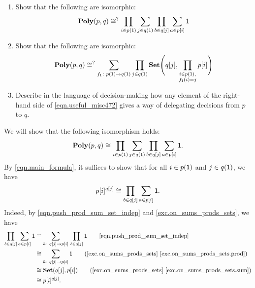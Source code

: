 \documentclass[Book-Poly]{subfiles}
\begin{document}
\begin{exercise}\label{exc.practice_sum_prod}
\begin{enumerate}
\item Show that the following are isomorphic:
\begin{equation}\label{eqn.poly_p_q}
  \mathbf{Poly}(p,q)
  \cong^?
  \prod_{i\in p(\textsf{1})}\sum_{j\in q(\textsf{1})}\prod_{b\in q[j]}\sum_{a\in p[i]}\textsf{1}
\end{equation}
\item \label{exc.practice_sum_prod.useful} Show that the following are isomorphic:
	\begin{equation}\label{eqn.useful_misc472}
	\mathbf{Poly}(p,q)\cong^?\sum_{f_{\textsf{1}}\colon p(\textsf{1})\to q(\textsf{1})}\prod_{j\in q(\textsf{1})}\mathbf{Set}\Bigg(q[j],\prod_{\substack{i \in p(\textsf{1}), \\ f_{\textsf{1}}(i) = j}}p[i]\Bigg)
	\end{equation}
\item Describe in the language of decision-making how any element of the right-hand side of \eqref{eqn.useful_misc472} gives a way of delegating decisions from $p$ to $q$.
\qedhere
\end{enumerate}
\begin{solution}
\begin{longenum}
\item We will show that the following isomorphism holds:
\[
  \mathbf{Poly}(p,q)
  \cong
  \prod_{i\in p(\textsf{1})}\sum_{j\in q(\textsf{1})}\prod_{b\in q[j]}\sum_{a\in p[i]}\textsf{1}.
\]
By \eqref{eqn.main_formula}, it suffices to show that for all $i \in p(\textsf{1})$ and $j \in q(\textsf{1})$, we have
\[
    p[i]^{q[j]} \cong \prod_{b \in q[j]} \sum_{a \in p[i]} \textsf{1}.
\]
Indeed, by \eqref{eqn.push_prod_sum_set_indep} and \cref{exc.on_sums_prods_sets}, we have
\begin{align*}
    \prod_{b \in q[j]} \sum_{a \in p[i]} \1 &\iso \sum_{\bar{a} \colon q[j] \to p[i]} \, \prod_{b \in q[j]} \1 \tag*{\eqref{eqn.push_prod_sum_set_indep}} \\
    &\iso \sum_{\bar{a} \colon q[j] \to p[i]} \1 \tag{\cref{exc.on_sums_prods_sets} \cref{exc.on_sums_prods_sets.prod}} \\
    &\iso \smset(q[j], p[i]) \tag{\cref{exc.on_sums_prods_sets} \cref{exc.on_sums_prods_sets.sum}} \\
    &\iso p[i]^{q[j]}.
\end{align*}


\end{longenum}
\end{solution}
\end{exercise}
\end{document}
